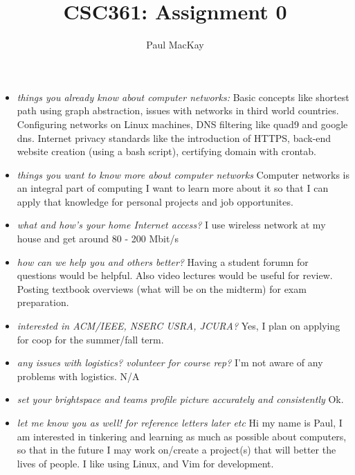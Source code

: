 \documentclass{article}
\begin{document}
\title{CSC361: Assignment 0}
\author{Paul MacKay}

\maketitle

\begin{itemize}
	\item \textit {things you already know about computer networks: } \newline
		Basic concepts like shortest path using graph abstraction, issues with networks in third world countries.
		Configuring networks on Linux machines, DNS filtering like quad9 and google dns. Internet privacy standards
		like the introduction of HTTPS, back-end website creation (using a bash script), certifying domain with crontab.
	\item \textit {things you want to know more about computer networks }\newline
		Computer networks is an integral part of computing I want to learn more about it so that I can apply that
		knowledge for personal projects and job opportunites.
	\item \textit {what and how's your home Internet access?} \newline
		I use wireless network at my house and get around 80 - 200 Mbit/s
	\item \textit {how can we help you and others better?} \newline
		Having a student forumn for questions would be helpful. Also video lectures would be useful for review.
		Posting textbook overviews (what will be on the midterm) for exam preparation.
	\item \textit {interested in ACM/IEEE, NSERC USRA, JCURA?} \newline
		Yes, I plan on applying for coop for the summer/fall term.
	\item \textit {any issues with logistics? volunteer for course rep?} \newline
		I'm not aware of any problems with logistics. N/A
	\item \textit {set your brightspace and teams profile picture accurately and consistently} \newline
		Ok.
	\item \textit {let me know you as well! for reference letters later etc} \newline
		Hi my name is Paul, I am interested in tinkering and learning as much as possible about computers,
		so that in the future I may work on/create a project(s) that will better the lives of people. I like using
		Linux, and Vim for development.
\end{itemize}
\end{document}
